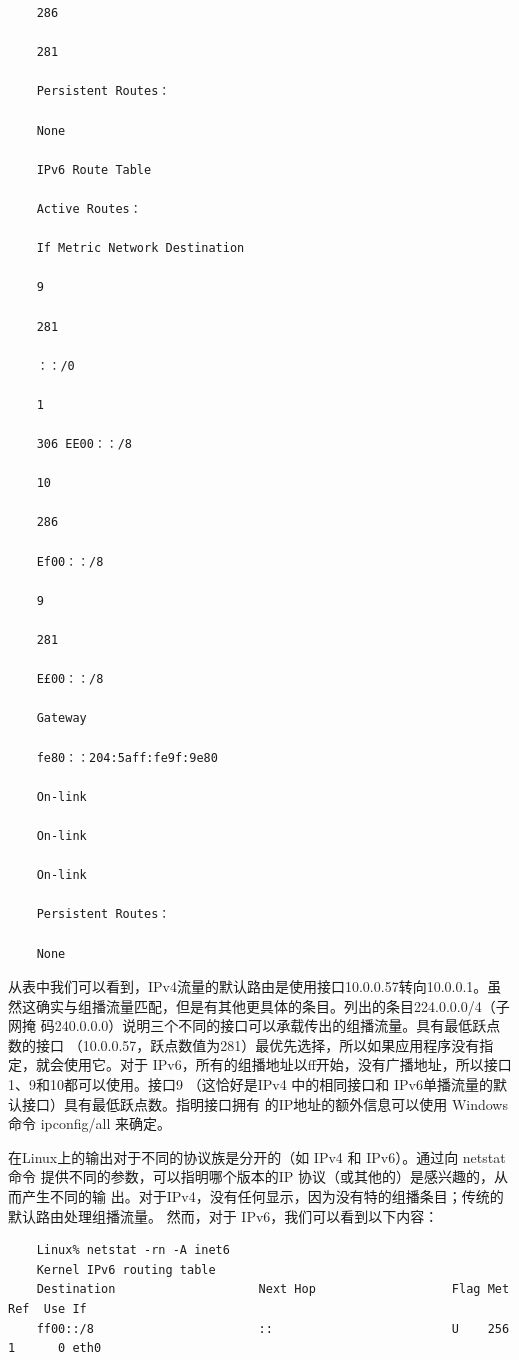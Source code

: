 \begin{verbatim}
    286
    
    281
    
    Persistent Routes：
    
    None
    
    IPv6 Route Table
    
    Active Routes：
    
    If Metric Network Destination
    
    9
    
    281
    
    ：：/0
    
    1
    
    306 EE00：：/8
    
    10
    
    286
    
    Ef00：：/8
    
    9
    
    281
    
    E£00：：/8
    
    Gateway
    
    fe80：：204:5aff:fe9f:9e80
    
    On-link
    
    On-link
    
    On-link
    
    Persistent Routes：
    
    None
\end{verbatim}

从表中我们可以看到，IPv4流量的默认路由是使用接口10.0.0.57转向10.0.0.1。虽
然这确实与组播流量匹配，但是有其他更具体的条目。列出的条目224.0.0.0/4（子网掩
码240.0.0.0）说明三个不同的接口可以承载传出的组播流量。具有最低跃点数的接口
（10.0.0.57，跃点数值为281）最优先选择，所以如果应用程序没有指定，就会使用它。对于
IPv6，所有的组播地址以ff开始，没有广播地址，所以接口1、9和10都可以使用。接口9
（这恰好是IPv4 中的相同接口和 IPv6单播流量的默认接口）具有最低跃点数。指明接口拥有
的IP地址的额外信息可以使用 Windows 命令 ipconfig/all 来确定。

在Linux上的输出对于不同的协议族是分开的（如 IPv4 和 IPv6）。通过向 netstat 命令
提供不同的参数，可以指明哪个版本的IP 协议（或其他的）是感兴趣的，从而产生不同的输
出。对于IPv4，没有任何显示，因为没有特的组播条目；传统的默认路由处理组播流量。
然而，对于 IPv6，我们可以看到以下内容：

\begin{verbatim}
    Linux% netstat -rn -A inet6
    Kernel IPv6 routing table
    Destination                    Next Hop                   Flag Met Ref  Use If
    ff00::/8                       ::                         U    256 1      0 eth0
\end{verbatim}

